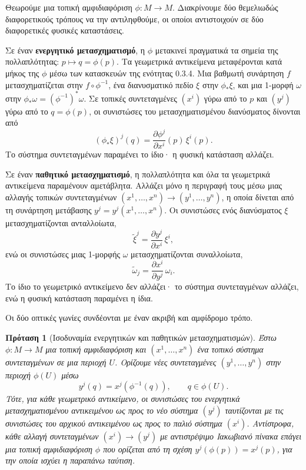 \documentclass[11pt,a4paper,twoside,openright]{book}
\newtheorem{proposition}[lemma]{Πρόταση}
\begin{document}
Θεωρούμε μια τοπική αμφιδιαφόριση $\phi: M \to M$. Διακρίνουμε δύο θεμελιωδώς διαφορετικούς τρόπους να την αντιληφθούμε, οι οποίοι αντιστοιχούν σε δύο διαφορετικές φυσικές καταστάσεις.

Σε έναν \textbf{ενεργητικό μετασχηματισμό}, η $\phi$ μετακινεί πραγματικά τα σημεία της πολλαπλότητας: $p \mapsto q = \phi(p)$. Τα γεωμετρικά αντικείμενα μεταφέρονται κατά μήκος της $\phi$ μέσω των κατασκευών της ενότητας 0.3.4. Μια βαθμωτή συνάρτηση $f$ μετασχηματίζεται στην $f \circ \phi^{-1}$, ένα διανυσματικό πεδίο $\xi$ στην $\phi_* \xi$, και μια 1-μορφή $\omega$ στην $\phi_* \omega = (\phi^{-1})^* \omega$. Σε τοπικές συντεταγμένες $(x^i)$ γύρω από το $p$ και $(y^j)$ γύρω από το $q = \phi(p)$, οι συνιστώσες του μετασχηματισμένου διανύσματος δίνονται από
\begin{equation}
(\phi_* \xi)^j(q) = \frac{\partial \phi^j}{\partial x^i}(p) \, \xi^i(p). \tag{0.29}
\end{equation}
Το σύστημα συντεταγμένων παραμένει το ίδιο· η φυσική κατάσταση αλλάζει.

Σε έναν \textbf{παθητικό μετασχηματισμό}, η πολλαπλότητα και όλα τα γεωμετρικά αντικείμενα παραμένουν αμετάβλητα. Αλλάζει μόνο η περιγραφή τους μέσω μιας αλλαγής τοπικών συντεταγμένων $(x^1, \dots, x^n) \to (y^1, \dots, y^n)$, η οποία δίνεται από τη συνάρτηση μετάβασης $y^j = y^j(x^1, \dots, x^n)$. Οι συνιστώσες ενός διανύσματος $\xi$ μετασχηματίζονται ανταλλοίωτα,
\begin{equation}
\tilde{\xi}^j = \frac{\partial y^j}{\partial x^i} \, \xi^i, \tag{0.30}
\end{equation}
ενώ οι συνιστώσες μιας 1-μορφής $\omega$ μετασχηματίζονται συναλλοίωτα,
\begin{equation}
\tilde{\omega}_j = \frac{\partial x^i}{\partial y^j} \, \omega_i. \tag{0.31}
\end{equation}
Το ίδιο το γεωμετρικό αντικείμενο δεν αλλάζει· το σύστημα συντεταγμένων αλλάζει, ενώ η φυσική κατάσταση παραμένει η ίδια.

Οι δύο οπτικές γωνίες συνδέονται με έναν ακριβή και αμφίδρομο τρόπο.

\begin{proposition}[Ισοδυναμία ενεργητικών και παθητικών μετασχηματισμών]
\label{prop:equivalence}
Έστω $\phi: M \to M$ μια τοπική αμφιδιαφόριση και $(x^1, \dots, x^n)$ ένα τοπικό σύστημα συντεταγμένων σε μια περιοχή $U$. Ορίζουμε νέες συντεταγμένες $(y^1, \dots, y^n)$ στην περιοχή $\phi(U)$ μέσω
\[
y^j(q) = x^j(\phi^{-1}(q)), \qquad q \in \phi(U).
\]
Τότε, για κάθε γεωμετρικό αντικείμενο, οι συνιστώσες του ενεργητικά μετασχηματισμένου αντικειμένου ως προς το νέο σύστημα $(y^j)$ ταυτίζονται με τις συνιστώσες του αρχικού αντικειμένου ως προς το παλιό σύστημα $(x^i)$. Αντίστροφα, κάθε αλλαγή συντεταγμένων $(x^i) \to (y^j)$ με αντιστρέψιμο Ιακωβιανό πίνακα επάγει μια τοπική αμφιδιαφόριση $\phi$ που ορίζεται από τη σχέση $y^j(\phi(p)) = x^j(p)$, για την οποία ισχύει η παραπάνω ταύτιση.
\end{proposition}
\end{document}
